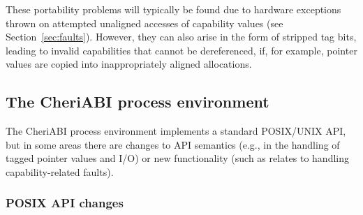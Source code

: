 \documentclass[11pt]{article}
\begin{document}
These portability problems will typically be found due to hardware exceptions
thrown on attempted unaligned accesses of capability values
(see Section~\ref{sec:faults}).
However, they can also arise in the form of stripped tag bits, leading to
invalid capabilities that cannot be dereferenced, if, for example, pointer
values are copied into inappropriately aligned allocations.

\subsection{The CheriABI process environment}
\label{sec:cheriabi}

The CheriABI process environment implements a standard POSIX/UNIX API, but in
some areas there are changes to API semantics (e.g., in the handling of tagged
pointer values and I/O) or new functionality (such as relates to handling
capability-related faults).

\subsubsection{POSIX API changes}
\end{document}
